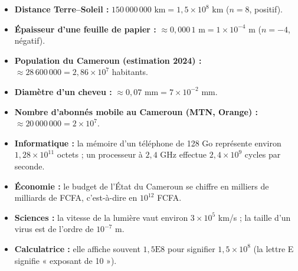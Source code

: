 \documentclass[11pt]{article}
\begin{document}
\begin{exemplebox}
\begin{itemize}
    \item \textbf{Distance Terre--Soleil :} $150\,000\,000 \text{ km} = 1,5 \times 10^8 \text{ km}$ ($n=8$, positif).
    \item \textbf{Épaisseur d'une feuille de papier :} $\approx 0,000\,1 \text{ m} = 1 \times 10^{-4} \text{ m}$ ($n=-4$, négatif).
    \item \textbf{Population du Cameroun (estimation 2024) :} $\approx 28\,600\,000 = 2,86 \times 10^7$ habitants.
    \item \textbf{Diamètre d'un cheveu :} $\approx 0,07 \text{ mm} = 7 \times 10^{-2} \text{ mm}$.
    \item \textbf{Nombre d'abonnés mobile au Cameroun (MTN, Orange) :} $\approx 20\,000\,000 = 2 \times 10^7$.
\end{itemize}
\end{exemplebox}

\begin{savaistu}
\begin{itemize}
    \item \textbf{Informatique :} la mémoire d'un téléphone de 128 Go représente environ $1,28 \times 10^{11}$ octets ; un processeur à $2,4$ GHz effectue $2,4 \times 10^9$ cycles par seconde.
    \item \textbf{Économie :} le budget de l'État du Cameroun se chiffre en milliers de milliards de FCFA, c'est-à-dire en $10^{12}$ FCFA.
    \item \textbf{Sciences :} la vitesse de la lumière vaut environ $3 \times 10^5$ km/s ; la taille d'un virus est de l'ordre de $10^{-7}$ m.
    \item \textbf{Calculatrice :} elle affiche souvent $1,5\text{E}8$ pour signifier $1,5 \times 10^8$ (la lettre E signifie « exposant de 10 »).
\end{itemize}
\end{savaistu}
\end{document}

